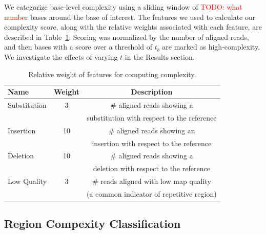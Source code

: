 \documentclass[12pt]{article}
\newcommand\TODO[1]{\textcolor{red}{TODO: #1}}
\begin{document}
We categorize base-level complexity using a sliding
window of \TODO{what number} bases around the base of interest.  The features we used to
calculate our complexity score, along with the relative weights associated with
each feature, are described in Table~\ref{complexity}.
Scoring was normalized by the number of aligned reads, and then bases with a score over a threshold of $t_b$ are marked as high-complexity. We investigate the effects of varying $t$ in the Results section.
\begin{table}[h!]
\tiny
  \centering
	\begin{tabular}{|l|c|c|}
    \hline Name & Weight & Description \\\hline
    Substitution & 3 & $\#$ aligned reads showing a \\ && substitution with respect to the reference\\\hline
    Insertion & 10 & $\#$ aligned reads showing an \\ && insertion with respect to the reference\\\hline
    Deletion & 10 & $\#$ aligned reads showing a \\ && deletion with respect to the reference\\\hline
    Low Quality & 3 & $\#$ reads aligned with low map quality \\ && (a common indicator of repetitive region)\\\hline
  \end{tabular}
  \caption{Relative weight of features for computing complexity.}
  \label{complexity}
\end{table}


\subsection{Region Compexity Classification}
\end{document}
